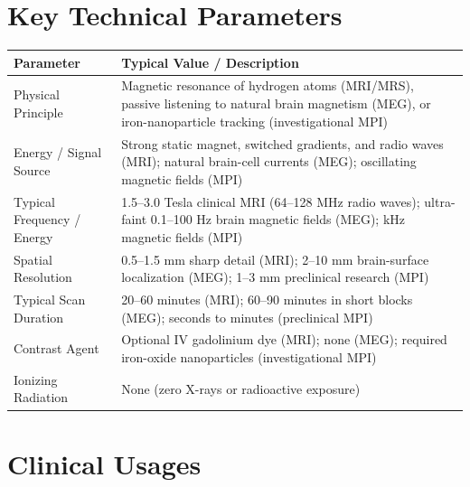 \section{Key Technical Parameters}
\noindent
\begin{tabularx}{\textwidth}{@{}l X@{}}
\toprule
\textbf{Parameter} & \textbf{Typical Value / Description} \\
\midrule
Physical Principle & Magnetic resonance of hydrogen atoms (MRI/MRS), passive listening to natural brain magnetism (MEG), or iron-nanoparticle tracking (investigational MPI) \\
Energy / Signal Source & Strong static magnet, switched gradients, and radio waves (MRI); natural brain-cell currents (MEG); oscillating magnetic fields (MPI) \\
Typical Frequency / Energy & 1.5--3.0 Tesla clinical MRI (64--128 MHz radio waves); ultra-faint 0.1--100 Hz brain magnetic fields (MEG); kHz magnetic fields (MPI) \\
Spatial Resolution & 0.5--1.5 mm sharp detail (MRI); 2--10 mm brain-surface localization (MEG); 1--3 mm preclinical research (MPI) \\
Typical Scan Duration & 20--60 minutes (MRI); 60--90 minutes in short blocks (MEG); seconds to minutes (preclinical MPI) \\
Contrast Agent & Optional IV gadolinium dye (MRI); none (MEG); required iron-oxide nanoparticles (investigational MPI) \\
Ionizing Radiation & None (zero X-rays or radioactive exposure) \\
\bottomrule
\end{tabularx}

\section{Clinical Usages}

